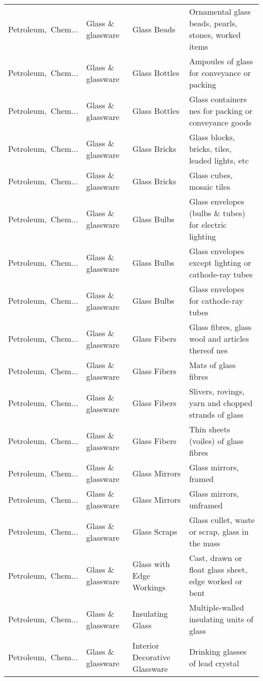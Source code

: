 \begin{appendices}
\begin{xltabular}{\textwidth}{|p{0.10\textwidth}|p{0.25\textwidth}|p{0.24\textwidth}|p{0.31\textwidth}|}
Petroleum,\ Chem... & Glass \& glassware & Glass Beads & Ornamental glass beads, pearls, stones, worked items \\
Petroleum,\ Chem... & Glass \& glassware & Glass Bottles & Ampoules of glass for conveyance or packing \\
Petroleum,\ Chem... & Glass \& glassware & Glass Bottles & Glass containers nes for packing or conveyance goods \\
Petroleum,\ Chem... & Glass \& glassware & Glass Bricks & Glass blocks, bricks, tiles, leaded lights, etc \\
Petroleum,\ Chem... & Glass \& glassware & Glass Bricks & Glass cubes, mosaic tiles \\
Petroleum,\ Chem... & Glass \& glassware & Glass Bulbs & Glass envelopes (bulbs \& tubes) for electric lighting \\
Petroleum,\ Chem... & Glass \& glassware & Glass Bulbs & Glass envelopes except lighting or cathode-ray tubes \\
Petroleum,\ Chem... & Glass \& glassware & Glass Bulbs & Glass envelopes for cathode-ray tubes \\
Petroleum,\ Chem... & Glass \& glassware & Glass Fibers & Glass fibres, glass wool and articles thereof nes \\
Petroleum,\ Chem... & Glass \& glassware & Glass Fibers & Mats of glass fibres \\
Petroleum,\ Chem... & Glass \& glassware & Glass Fibers & Slivers, rovings, yarn and chopped strands of glass \\
Petroleum,\ Chem... & Glass \& glassware & Glass Fibers & Thin sheets (voiles) of glass fibres \\
Petroleum,\ Chem... & Glass \& glassware & Glass Mirrors & Glass mirrors, framed \\
Petroleum,\ Chem... & Glass \& glassware & Glass Mirrors & Glass mirrors, unframed \\
Petroleum,\ Chem... & Glass \& glassware & Glass Scraps & Glass cullet, waste or scrap, glass in the mass \\
Petroleum,\ Chem... & Glass \& glassware & Glass with Edge Workings & Cast, drawn or float glass sheet, edge worked or bent \\
Petroleum,\ Chem... & Glass \& glassware & Insulating Glass & Multiple-walled insulating units of glass \\
Petroleum,\ Chem... & Glass \& glassware & Interior Decorative Glassware & Drinking glasses of lead crystal \\

\end{xltabular}
\end{appendices}

